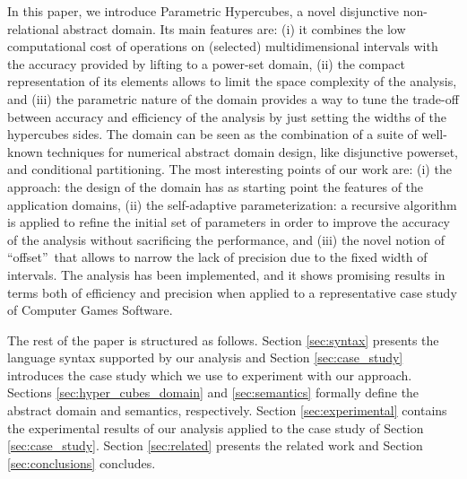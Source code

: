 In this paper, we introduce Parametric Hypercubes, a novel disjunctive non-relational abstract domain. Its main features are: (i) it combines the low computational cost of operations on (selected) multidimensional intervals with the accuracy provided by lifting to a power-set domain, (ii) the compact representation of its elements allows to limit the space complexity of the analysis, and (iii) the parametric nature of the domain provides a way to tune the trade-off between accuracy and efficiency of the analysis by just setting the widths of the hypercubes sides. The domain can be seen as the combination of a suite of well-known techniques for numerical abstract domain design, like disjunctive powerset, and conditional partitioning. The most interesting points of our work are: (i) the approach: the design of the domain has as starting point the features of the application domains, (ii) the self-adaptive parameterization: a recursive algorithm is applied to refine the initial set of parameters in order to improve the accuracy of the analysis without sacrificing the performance, and (iii) the novel notion of \textquotedblleft offset\textquotedblright\ that allows to narrow the lack of precision due to the fixed width of intervals.
The analysis has been implemented, and it shows promising results in terms both of efficiency and precision when applied to a representative case study of Computer Games Software. 

The rest of the paper is structured as follows. Section \ref{sec:syntax} presents the language syntax supported by our analysis and Section \ref{sec:case_study} introduces the case study which we use to experiment with our approach. Sections \ref{sec:hyper_cubes_domain} and \ref{sec:semantics} formally define the abstract domain and semantics, respectively. %
Section \ref{sec:experimental} contains the experimental results of our analysis applied to the case study of Section \ref{sec:case_study}. Section \ref{sec:related} presents the related work and Section \ref{sec:conclusions} concludes.

